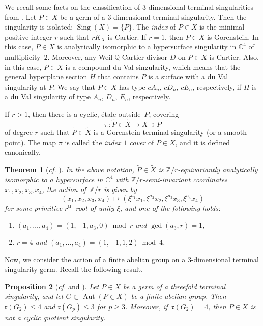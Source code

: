 \documentclass[11pt]{amsart}
\numberwithin{equation}{section}
\newtheorem{thm}{Theorem}[section]
\newtheorem{proposition}[thm]{Proposition}
\theoremstyle{definition}
\theoremstyle{remark}
\newcommand{\lra}{\longrightarrow}
\DeclareMathOperator{\Aut}{Aut}
\DeclareMathOperator{\Sing}{Sing}
\newcommand{\supth}[1]{\ensuremath{#1^{\mathrm{th}}}}
\begin{document}
We recall some facts on the classification of $3$-dimensional terminal singularities from \cite{Mo85,Re85}. 
Let $P\in X$ be a germ of a $3$-dimensional terminal singularity. Then the singularity is isolated: $\Sing(X) = \{P\}$. The \emph{index} of $P\in X$ is the minimal positive integer $r$ such that $rK_X$ is Cartier. If $r = 1$, then $P\in X$ is Gorenstein. In this case, $P\in X$ is analytically isomorphic to a hypersurface singularity in $\mathbb{C}^4$ of multiplicity~$2$. Moreover, any Weil $\mathbb{Q}$-Cartier divisor $D$ on $P\in X$ is Cartier. Also, in this case, $P\in X$ is a compound du Val singularity, which means that the general hyperplane section $H$ that contains $P$ is a surface with a du Val singularity at $P$. We say that $P\in X$ has type $cA_n$, $cD_n$, $cE_n$, respectively, if $H$ is a du Val singularity of type $A_n$, $D_n$, $E_n$, respectively. 

 If $r > 1$, then there is a cyclic, \'etale outside~$P$, covering 
\[
\pi\colon \widetilde{P}\in \widetilde{X} \lra X\ni P
\] 
of degree $r$ such that $\widetilde{P}\in \widetilde{X}$ is a Gorenstein terminal singularity (or a smooth point). The map $\pi$ is called the \emph{index $1$ cover} of $P\in X$, and it is defined canonically.

\begin{thm}[\textit{cf.} {\cite{Mo85, Re85}}]
\label{thm-terminal-sing}
In the above notation, 
$\widetilde{P}\in \widetilde{X}$ is $\mathbb{Z}/r$-equivariantly analytically isomorphic to a hypersurface in $\mathbb{C}^4$ with $\mathbb{Z}/r$-semi-invariant coordinates $x_1,x_2,x_3,x_4$, the action of\, $\mathbb{Z}/r$ is given by
\[
(x_1,x_2,x_3,x_4)\longmapsto (\xi^{a_1}x_1,\xi^{a_2}x_2,\xi^{a_3}x_3,\xi^{a_4}x_4)
\]
for some primitive $\supth{r}$ root of unity $\xi$, and one of the following holds:
\begin{enumerate}
\item
$(a_1,\ldots,a_4) = (1,-1,a_3,0)\bmod r$ and $\gcd(a_3, r) = 1$,
\item
$r = 4$ and $(a_1,\ldots,a_4) = (1,-1,1,2)\bmod 4$.
\end{enumerate} 
\end{thm}

Now, we consider the action of a finite abelian group on a $3$-dimensional terminal singularity germ. Recall the following result.

\begin{proposition}[\textit{cf.} {\cite[Lemma 2.4]{Pr11} and \cite[Lemma 2.1]{Pr14}}]
\label{prop-p-action-on-terminal-point}
Let $P\in X$ be a germ of a threefold terminal singularity, and let
$G \subset \Aut(P\in X)$ be a finite abelian group. Then
$\mathfrak{r}(G_2) \leq 4$ and $\mathfrak{r}(G_p)\leq 3$ for $p\geq 3$. 
Moreover, if\, $\mathfrak{r}(G_2)=4$, then $P\in X$ is not a cyclic quotient singularity.
\end{proposition}
\end{document}
